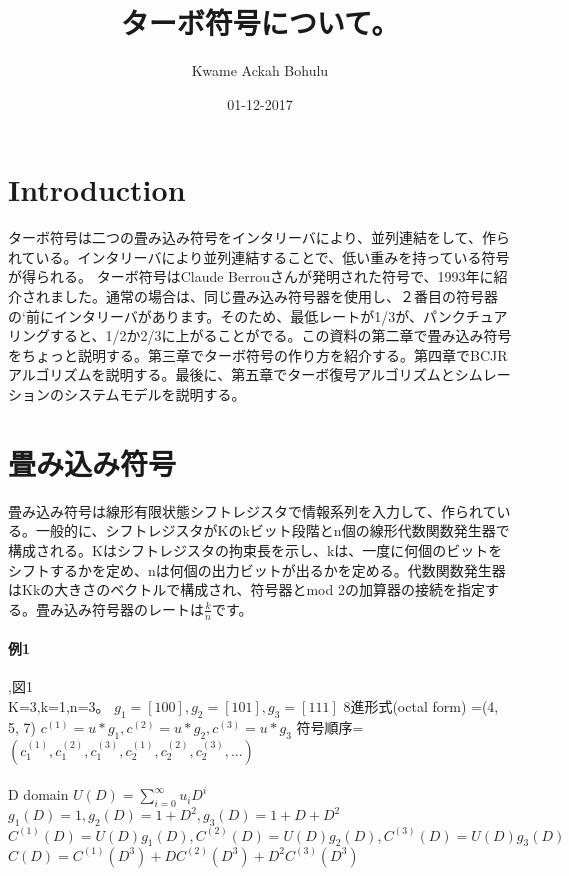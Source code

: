 \documentclass[20 pts]{article}
\title{ターボ符号について。}
\author{Kwame Ackah Bohulu}
\date{01-12-2017}
\begin{document}
\maketitle


\section{Introduction}
 ターボ符号は二つの畳み込み符号をインタリーバにより、並列連結をして、作られている。インタリーバにより並列連結することで、低い重みを持っている符号が得られる。  ターボ符号はClaude Berrouさんが発明された符号で、1993年に紹介されました。通常の場合は、同じ畳み込み符号器を使用し、２番目の符号器の`前にインタリーバがあります。そのため、最低レートが1/3が、パンクチュアリングすると、1/2か2/3に上がることがでる。この資料の第二章で畳み込み符号をちょっと説明する。第三章でターボ符号の作り方を紹介する。第四章でBCJRアルゴリズムを説明する。最後に、第五章でターボ復号アルゴリズムとシムレーションのシステムモデルを説明する。


\section{畳み込み符号}
畳み込み符号は線形有限状態シフトレジスタで情報系列を入力して、作られている。一般的に、シフトレジスタがKのkビット段階とn個の線形代数関数発生器で構成される。Kはシフトレジスタの拘束長を示し、kは、一度に何個のビットをシフトするかを定め、nは何個の出力ビットが出るかを定める。代数関数発生器はKkの大きさのベクトルで構成され、符号器とmod 2の加算器の接続を指定する。畳み込み符号器のレートは$\frac{k}{n}$です。
\paragraph{例1},図1\\
K=3,k=1,n=3。\newline
$g_1=[1 0 0], g_2=[1 0 1], g_3=[1 1 1]$\newline
8進形式(octal form) =(4, 5, 7)\newline
$c^{(1)}=u*g_1,c^{(2)}=u*g_2,c^{(3)}=u*g_3$\newline
符号順序=$(c_1^{(1)},c_1^{(2)},c_1^{(3)},c_2^{(1)},c_2^{(2)},c_2^{(3)},...)$
\paragraph{}
D domain\newline
$U(D)=\sum_{i=0}^{\infty} u_iD^i $\newline
$g_1(D)=1,g_2(D)=1+D^2,g_3(D)=1+D+D^2$\newline
$C^{(1)}(D)=U(D)g_1(D),C^{(2)}(D)=U(D)g_2(D),C^{(3)}(D)=U(D)g_3(D)$\newline
$C(D)=C^{(1)}(D^3)+DC^{(2)}(D^3)+D^2C^{(3)}(D^3)$
\end{document}
